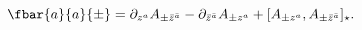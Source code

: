 \begin{equation}
 \fbar{a}{a}{\pm}=\partial_{z^a}A_{\pm\bar{z}^{\bar{a}}}
 -\partial_{\bar{z}^{\bar{a}}}A_{\pm z^a}+[A_{\pm z^a},
 A_{\pm\bar{z}^{\bar{a}}}]_\star.
\end{equation}


